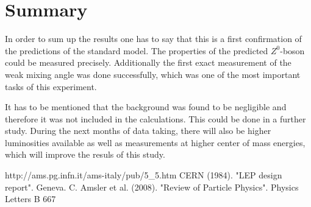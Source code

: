 \documentclass[epj,nopacs]{svjour}
\begin{document}
\section{ Summary}
In order to sum up the results one has to say that this is a first
confirmation of the predictions of the standard model. The properties of the
predicted $Z^0$-boson could be measured precisely. Additionally the first exact
measurement of the weak mixing angle was done successfully, which was one of the
most important tasks of this experiment.

It has to be mentioned that the background was found to be negligible and
therefore it was not included in the calculations. This could be done in a
further study. During the next months of data taking, there will also be higher
luminosities available as well as measurements at higher center of mass
energies, which will improve the resuls of this study.

\begin{thebibliography}{}
\baselineskip=0.38cm
 http://ams.pg.infn.it/ams-italy/pub/5\_5.htm
 CERN (1984). "LEP design report". Geneva.
 C. Amsler et al. (2008). "Review of Particle Physics". Physics Letters B 667

\end{thebibliography}
% 

% 
\end{document}
